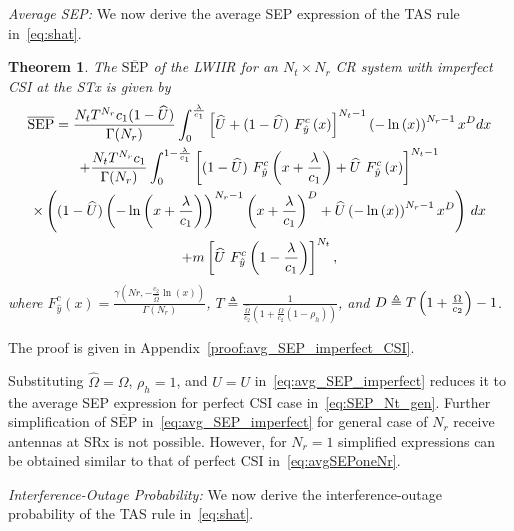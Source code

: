 \documentclass[12pt,draftcls,peerreview,onecolumn]{IEEEtran}
\newtheorem{theorem}{{\bf Theorem}}
\newcommand{\define}{\triangleq}
\newcommand{\SEP}{\text{SEP}}
\newcommand{\lam}{\lambda}
\newcommand{\Nt}{{N_t}}
\newcommand{\Nr}{{N_r}}
\newcommand{\cone}{c_{1}}
\newcommand{\ctwo}{c_{2}}
\newcommand{\m}{\cone}
\newcommand{\lambym}{\frac{\lam}{\m}}
\newcommand{\al}{\ctwo}
\newcommand{\snr}{\Omega}
\newcommand{\snrbyal}[1][]{\frac{\snr#1}{\al}}
\newcommand{\un}{U}
\newcommand{\avgSEP}{\overline{\SEP}}
\newcommand{\unhat}{\widehat{\un}}
\newcommand{\snrhat}{\widehat{\snr}}
\newcommand{\yhat}{\hat{y}}
\newcommand{\albysnrhat}[1][]{\frac{\al#1}{\snrhat}}
\newcommand{\snrhatbyal}[1][]{\frac{\snrhat#1}{\al}}
\newcommand{\rhoh}{\rho_h}
\newcommand{\Tc}{\frac{1}{\snrhatbyal\left(1 + \snrbyal\left(1 - \rhoh \right)  \right) }}
\newcommand{\T}{T}
\newcommand{\Dc}{\T \left( 1 + \snrbyal\right) -1}
\begin{document}
\newcommand{\avgSEPhat}{\widehat{\SEP}}

{\em Average SEP:} We now derive the average SEP expression of the TAS rule in~\eqref{eq:shat}. %

\begin{theorem}
\label{thm:avg_SEP_imperfect}
The $\avgSEP$ of the LWIIR for an $\Nt\times\Nr$ CR system with imperfect CSI at the STx is given by
\begin{multline}
\label{eq:avg_SEP_imperfect}
\avgSEP = \frac{\Nt \T^{\Nr}\m(1-\unhat)}{\Gamma(\Nr)}\int_{0}^{\lambym} \left[\unhat + \unccdfyhat{(1-\unhat)}{x}\right]^{\Nt-1} \yhattimespdfyNr dx\\
+ \frac{\Nt \T^{\Nr}\m}{\Gamma(\Nr)} \int_{0}^{1-\lambym}
\left[\unccdfyhat{(1-\unhat)}{x+\lambym} + \unccdfyhat{\unhat}{x}\right]^{\Nt-1}\\
\times\left((1-\unhat)\yhatpluslamtimespdfyNr+\unhat\yhattimespdfyNr\right)\, dx\\
+m\left[\unccdfyhat{\unhat}{1-\lambym}\right]^{\Nt},
\end{multline}
where $F_{\yhat}^{c}\left(x\right) = \frac{\gamma\left(Nr,-\albysnrhat[]\ln(x)\right)}{\Gamma(\Nr)}$, $\T \define \Tc$, and $\D \define \Dc$.	
\end{theorem}
\begin{IEEEproof}
	The proof is given in Appendix~\ref{proof:avg_SEP_imperfect_CSI}.
\end{IEEEproof}

Substituting $\snrhat=\snr$, $\rhoh=1$, and $\unhat=\un$ in~\eqref{eq:avg_SEP_imperfect} reduces it to the average SEP expression for perfect CSI case in~\eqref{eq:SEP_Nt_gen}. Further simplification of $\avgSEP$ in~\eqref{eq:avg_SEP_imperfect} for general case of $\Nr$ receive antennas at SRx is not possible. However, for $\Nr=1$ simplified expressions can be obtained similar to that of perfect CSI in~\eqref{eq:avgSEPoneNr}.



{\em Interference-Outage Probability:} We now derive the interference-outage probability of the TAS rule in~\eqref{eq:shat}.
\end{document}
